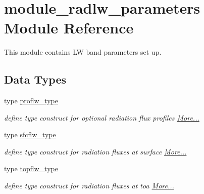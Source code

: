 \hypertarget{namespacemodule__radlw__parameters}{}\section{module\+\_\+radlw\+\_\+parameters Module Reference}
\label{namespacemodule__radlw__parameters}


This module contains LW band parameters set up.  


\subsection*{Data Types}
\begin{DoxyCompactItemize}
\item 
type \hyperlink{namespacemodule__radlw__parameters_structmodule__radlw__parameters_1_1proflw__type}{proflw\+\_\+type}
\begin{DoxyCompactList}\small\item\em define type construct for optional radiation flux profiles  \hyperlink{namespacemodule__radlw__parameters_structmodule__radlw__parameters_1_1proflw__type}{More...}\end{DoxyCompactList}\item 
type \hyperlink{namespacemodule__radlw__parameters_structmodule__radlw__parameters_1_1sfcflw__type}{sfcflw\+\_\+type}
\begin{DoxyCompactList}\small\item\em define type construct for radiation fluxes at surface  \hyperlink{namespacemodule__radlw__parameters_structmodule__radlw__parameters_1_1sfcflw__type}{More...}\end{DoxyCompactList}\item 
type \hyperlink{namespacemodule__radlw__parameters_structmodule__radlw__parameters_1_1topflw__type}{topflw\+\_\+type}
\begin{DoxyCompactList}\small\item\em define type construct for radiation fluxes at toa  \hyperlink{namespacemodule__radlw__parameters_structmodule__radlw__parameters_1_1topflw__type}{More...}\end{DoxyCompactList}\end{DoxyCompactItemize}
